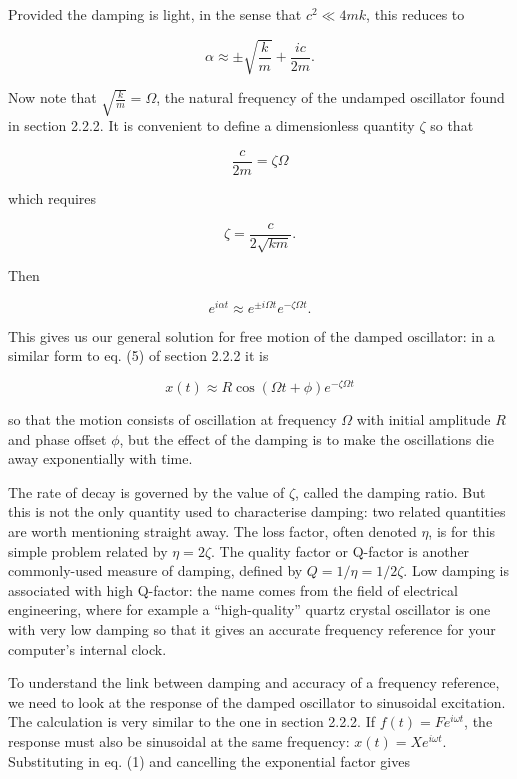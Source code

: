   Provided the damping is light, in the sense that $c^2 \ll 4mk$, this reduces 
  to 

  $$\alpha \approx \pm \sqrt{\frac{k}{m}} + \frac{ic}{2m}. \tag{4} $$ 

  Now note that $\sqrt{\frac{k}{m}}=\Omega$, the natural frequency of the 
  undamped oscillator found in section 2.2.2. It is convenient to define a 
  dimensionless quantity $\zeta$ so that 

  $$\frac{c}{2m} = \zeta \Omega \tag{5} $$ 

  which requires 

  $$\zeta=\frac{c}{2\sqrt{km}}. \tag{6} $$ 

  Then 

  $$e^{i \alpha t} \approx e^{\pm i \Omega t} e^{-\zeta \Omega t}. \tag{7} $$ 

  This gives us our general solution for free motion of the damped oscillator: 
  in a similar form to eq. (5) of section 2.2.2 it is 

  $$x(t) \approx R \cos(\Omega t + \phi) e^{-\zeta \Omega t} \tag{8} $$ 

  so that the motion consists of oscillation at frequency $\Omega$ with initial 
  amplitude $R$ and phase offset $\phi$, but the effect of the damping is to 
  make the oscillations die away exponentially with time. 

  The rate of decay is governed by the value of $\zeta$, called the damping 
  ratio. But this is not the only quantity used to characterise damping: two 
  related quantities are worth mentioning straight away. The loss factor, often 
  denoted $\eta$, is for this simple problem related by $\eta=2\zeta$. The 
  quality factor or Q-factor is another commonly-used measure of damping, 
  defined by $Q=1/\eta=1/2\zeta$. Low damping is associated with high Q-factor: 
  the name comes from the field of electrical engineering, where for example a 
  ``high-quality'' quartz crystal oscillator is one with very low damping so 
  that it gives an accurate frequency reference for your computer's internal 
  clock. 

  To understand the link between damping and accuracy of a frequency reference, 
  we need to look at the response of the damped oscillator to sinusoidal 
  excitation. The calculation is very similar to the one in section 2.2.2. If 
  $f(t)=F e^{i \omega t}$, the response must also be sinusoidal at the same 
  frequency: $x(t) = Xe^{i \omega t}$. Substituting in eq. (1) and cancelling 
  the exponential factor gives 

